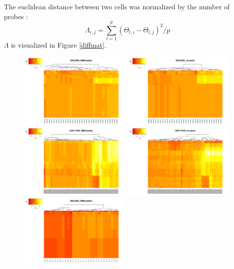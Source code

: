 \documentclass[11pt]{article}
\begin{document}
\noindent The euclidean distance between two cells was normalized by the number of probes : 
$$\Lambda_{i,j} = \sum_{l=1}^{p} (\Theta_{l, i} - \Theta_{l, j})^2 / p$$
$\Lambda$ is visualized in Figure \ref{diffmat}.


\begin{figure}[h]
\centering
\includegraphics[width=0.49\textwidth]{encode_MBAmethyl_theta_heat.pdf}
\includegraphics[width=0.49\textwidth]{encode_cnvJoint_theta_heat.pdf}\\
\includegraphics[width=0.49\textwidth]{poly_MBAmethyl_theta_heat.pdf}
\includegraphics[width=0.49\textwidth]{poly_cnvJoint_theta_heat.pdf}\\
\includegraphics[width=0.49\textwidth]{lung_MBAmethyl_theta_heat.pdf}

\end{figure}
\end{document}
